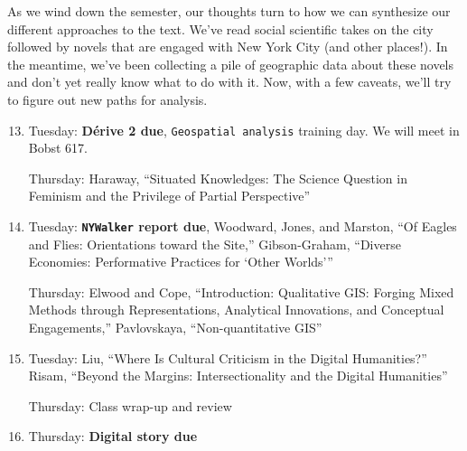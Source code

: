As we wind down the semester, our thoughts turn to how we can synthesize our
different approaches to the text. We’ve read social scientific takes on the
city followed by novels that are engaged with New York City (and other
places!). In the meantime, we’ve been collecting a pile of geographic data
about these novels and don’t yet really know what to do with it. Now, with a
few caveats, we’ll try to figure out new paths for analysis.

\begin{enumerate}
  \setcounter{enumi}{12}

  \item Tuesday: \textbf{\small Dérive 2 due}, \texttt{Geospatial analysis} training day. We will meet in Bobst 617.

    Thursday: Haraway, “Situated Knowledges: The Science Question in Feminism and the Privilege of Partial Perspective”

  \item Tuesday: \textbf{\texttt{NYWalker} \small report due}, Woodward, Jones, and Marston, “Of Eagles and Flies: Orientations toward the Site,” Gibson-Graham, “Diverse Economies: Performative Practices for ‘Other Worlds’”

    Thursday: Elwood and Cope, “Introduction: Qualitative GIS: Forging Mixed Methods through Representations, Analytical Innovations, and Conceptual Engagements,”  Pavlovskaya, “Non-quantitative GIS”

  \item Tuesday: Liu, “Where Is Cultural Criticism in the Digital Humanities?” Risam, “Beyond the Margins: Intersectionality and the Digital Humanities”

    Thursday: Class wrap-up and review

  \item Thursday: \textbf{\small Digital story due}

\end{enumerate}
